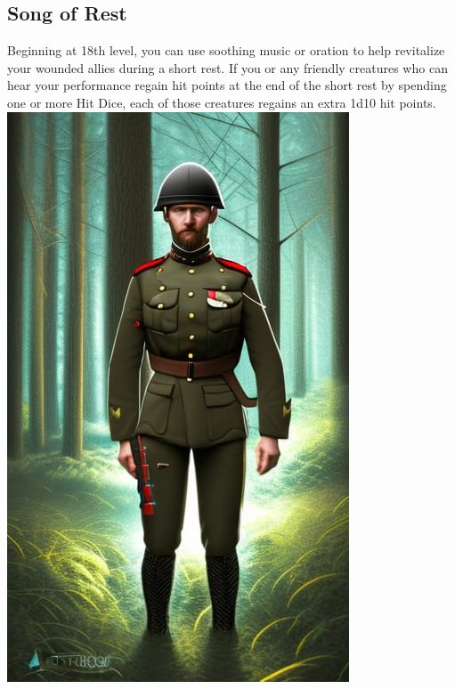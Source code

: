 \documentclass[a4paper,10pt,twoside,twocolumn, bg=full]{dndbook} %
\begin{document}
			\subsection{Song of Rest}
Beginning at 18th level, you can use soothing music or oration to help revitalize your wounded allies during a short rest. If you or any friendly creatures who can hear your performance regain hit points at the end of the short rest by spending one or more Hit Dice, each of those creatures regains an extra 1d10 hit points.
	\vfill
	\includegraphics[width=\linewidth]{img.jpg}
	
\end{document}
